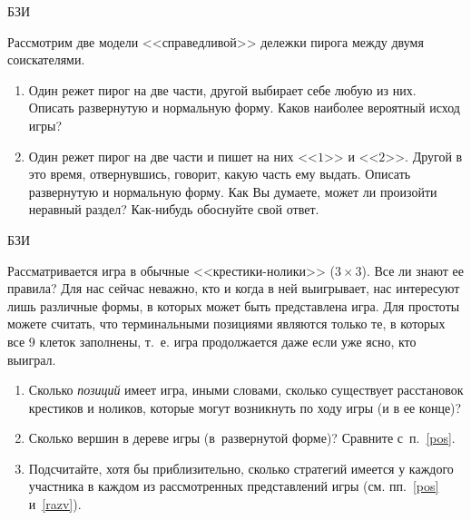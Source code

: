 \begin{problem}
\begin{source}
БЗИ
\end{source} Рассмотрим две модели
<<справедливой>> дележки пирога между двумя соискателями.

\begin{enumerate}

\item Один режет пирог на две части, другой выбирает себе
любую из них. Описать развернутую и нормальную форму. Каков
наиболее вероятный исход игры?

\item Один режет пирог на две части и пишет на них <<$1$>>
и <<$2$>>. Другой в это время, отвернувшись, говорит, какую
часть ему выдать. Описать развернутую и нормальную форму.
Как Вы думаете, может ли произойти неравный раздел?
Как-нибудь обоснуйте свой ответ.

\end{enumerate}






\begin{sol}

\end{sol}
\end{problem}




\begin{problem}
\begin{source}
БЗИ
\end{source} Рассматривается игра в
обычные <<крестики-нолики>> (${3\times 3}$). Все ли знают
ее правила? Для нас сейчас неважно, кто и когда в ней
выигрывает, нас интересуют лишь различные формы, в которых
может быть представлена игра. Для простоты можете считать,
что терминальными позициями являются только те, в которых
все 9 клеток заполнены, т.~е. игра продолжается даже если
уже ясно, кто выиграл.

\begin{enumerate}

\item\label{pos} Сколько {\it позиций} имеет игра, иными
словами, сколько существует расстановок крестиков и
ноликов, которые могут возникнуть по ходу игры (и в ее
конце)?

\item\label{razv} Сколько вершин в дереве игры
(в~развернутой форме)?  Сравните с~п.~\ref{pos}.

\item Подсчитайте, хотя бы приблизительно, сколько
стратегий имеется у каждого участника в каждом из
рассмотренных представлений игры (см. пп.~\ref{pos}
и~\ref{razv}).

\end{enumerate}






\begin{sol}

\end{sol}
\end{problem}



